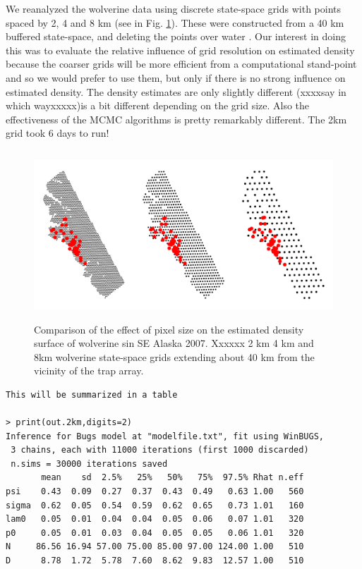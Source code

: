 {We reanalyzed the wolverine data using discrete state-space grids with
points spaced by 2, 4 and 8 km (see in
Fig. \ref{scr0.fig.wolvgrids}). These were constructed from a 40 km
buffered state-space, and deleting the points over water
\citep[see][]{royle_etal:2011jwm}.  Our interest in doing this was to
evaluate the relative influence of grid resolution on estimated
density because the coarser grids will be more efficient from a
computational stand-point and so we would prefer to use them, but
only if there is no strong influence on estimated density.
The density estimates are only slightly different (xxxxsay in which wayxxxxx)is a bit different depending on the grid size. Also the
effectiveness of the MCMC algorithms is pretty remarkably
different. The 2km grid took 6 days to run!

\begin{figure}
\begin{center}
\includegraphics[height=2.5in,width=5in]{Ch4/figs/wolvgrids}
\end{center}
\caption{Comparison of the effect of pixel size on the estimated density surface of wolverine sin SE Alaska 2007. Xxxxxx 2 km 4 km and 8km wolverine state-space grids extending about
40 km from the vicinity of the trap array. }
\label{scr0.fig.wolvgrids}
\end{figure}

{\small
\begin{verbatim}
This will be summarized in a table

> print(out.2km,digits=2)
Inference for Bugs model at "modelfile.txt", fit using WinBUGS,
 3 chains, each with 11000 iterations (first 1000 discarded)
 n.sims = 30000 iterations saved
       mean    sd  2.5%   25%   50%   75%  97.5% Rhat n.eff
psi    0.43  0.09  0.27  0.37  0.43  0.49   0.63 1.00   560
sigma  0.62  0.05  0.54  0.59  0.62  0.65   0.73 1.01   160
lam0   0.05  0.01  0.04  0.04  0.05  0.06   0.07 1.01   320
p0     0.05  0.01  0.03  0.04  0.05  0.05   0.06 1.01   320
N     86.56 16.94 57.00 75.00 85.00 97.00 124.00 1.00   510
D      8.78  1.72  5.78  7.60  8.62  9.83  12.57 1.00   510


\end{verbatim}}}
